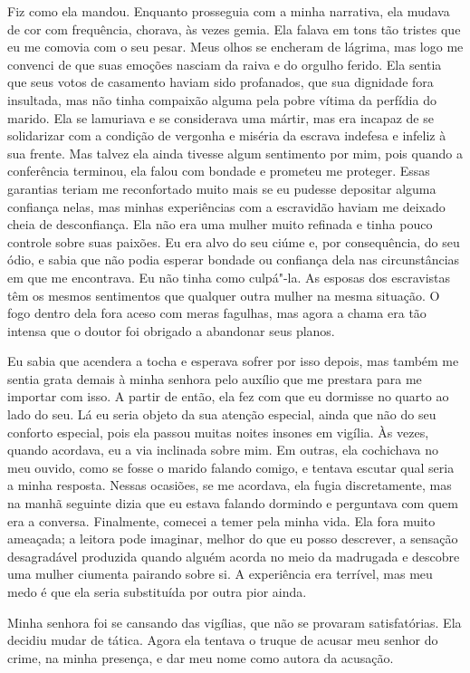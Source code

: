 Fiz como ela mandou. Enquanto
prosseguia com a minha narrativa, ela mudava de cor com frequência,
chorava, às vezes gemia. Ela falava em tons tão tristes que eu me
comovia com o seu pesar. Meus olhos se encheram de lágrima, mas logo me
convenci de que suas emoções nasciam da raiva e do orgulho ferido. Ela
sentia que seus votos de casamento haviam sido profanados, que sua
dignidade fora insultada, mas não tinha compaixão alguma pela pobre
vítima da perfídia do marido. Ela se lamuriava e se considerava uma
mártir, mas era incapaz de se solidarizar com a condição de vergonha e
miséria da escrava indefesa e infeliz à sua frente. Mas talvez ela ainda
tivesse algum sentimento por mim, pois quando a conferência terminou,
ela falou com bondade e prometeu me proteger. Essas garantias teriam me
reconfortado muito mais se eu pudesse depositar alguma confiança nelas,
mas minhas experiências com a escravidão haviam me deixado cheia de
desconfiança. Ela não era uma mulher muito refinada e tinha pouco
controle sobre suas paixões. Eu era alvo do seu ciúme e, por
consequência, do seu ódio, e sabia que não podia esperar bondade ou
confiança dela nas circunstâncias em que me encontrava. Eu não tinha
como culpá"-la. As esposas dos escravistas têm os mesmos sentimentos que
qualquer outra mulher na mesma situação. O fogo dentro dela fora aceso
com meras fagulhas, mas agora a chama era tão intensa que o doutor foi
obrigado a abandonar seus planos.

Eu sabia que acendera a tocha e
esperava sofrer por isso depois, mas também me sentia grata demais à
minha senhora pelo auxílio que me prestara para me importar com isso. A
partir de então, ela fez com que eu dormisse no quarto ao lado do seu.
Lá eu seria objeto da sua atenção especial, ainda que não do seu
conforto especial, pois ela passou muitas noites insones em vigília. Às
vezes, quando acordava, eu a via inclinada sobre mim. Em outras, ela
cochichava no meu ouvido, como se fosse o marido falando comigo, e
tentava escutar qual seria a minha resposta. Nessas ocasiões, se me
acordava, ela fugia discretamente, mas na manhã seguinte dizia que eu
estava falando dormindo e perguntava com quem era a conversa.
Finalmente, comecei a temer pela minha vida. Ela fora muito ameaçada; a
leitora pode imaginar, melhor do que eu posso descrever, a sensação
desagradável produzida quando alguém acorda no meio da madrugada e
descobre uma mulher ciumenta pairando sobre si. A experiência era
terrível, mas meu medo é que ela seria substituída por outra pior ainda.

Minha senhora foi se cansando das
vigílias, que não se provaram satisfatórias. Ela decidiu mudar de
tática. Agora ela tentava o truque de acusar meu senhor do crime, na
minha presença, e dar meu nome como autora da acusação.

